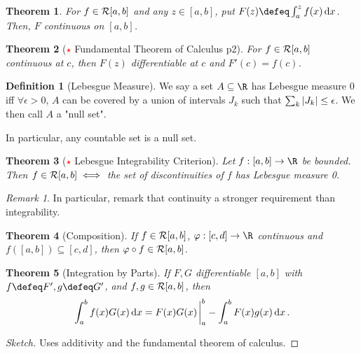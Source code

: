 \documentclass[12pt, oneside]{article}
\theoremstyle{definition}
\newtheorem{defn}{Definition}
\theoremstyle{plain}
\newtheorem{thm}{Theorem}
\theoremstyle{remark}
\newtheorem{remark}{Remark}
\begin{document}
\begin{thm}
  For $f \in \mathcal{R}[a, b]$ and any $z \in [a, b]$, put $F(z) \defeq \int_a^z f(x) \dd{x}$. Then, $F$ continuous on $[a, b]$.
\end{thm}

\begin{thm}[\textcolor{red}{$\star$} Fundamental Theorem of Calculus p2]
  For $f \in \mathcal{R}[a, b]$ continuous at $c$, then $F(z)$ differentiable at $c$ and $F'(c) = f(c)$.
\end{thm}


\begin{defn}[Lebesgue Measure]
  We say a set $A \subseteq \R$ has Lebesgue measure $0$ iff $\forall \epsilon > 0$, $A$ can be covered by a union of intervals $J_k$ such that $\sum_k \abs{J_k} \leq \epsilon$. We then call $A$ a "null set".

  In particular, any countable set is a null set.
\end{defn}

\begin{thm}[\textcolor{red}{$\star$} Lebesgue Integrability Criterion]
  Let $f : [a, b] \to \R$ be bounded. Then $f \in \mathcal{R}[a,b] \iff$ the set of discontinuities of $f$ has Lebesgue measure 0.
\end{thm}

\begin{remark}
  In particular, remark that continuity a stronger requirement than integrability.
\end{remark}

\begin{thm}[Composition]
  If $f \in \mathcal{R}[a, b]$, $\varphi : [c, d] \to \R$ continuous and $f([a, b]) \subseteq [c, d]$, then $\varphi \circ f \in \mathcal{R}[a, b]$.
\end{thm}

\begin{thm}[Integration by Parts]
  If $F, G$ differentiable $[a, b]$ with $f \defeq F', g \defeq G'$, and $f, g \in \mathcal{R}[a, b]$, then \[
  \int_a^b f(x) G(x) \dd{x} = F(x) G(x)\eval_{a}^b - \int_a^b F(x) g(x) \dd{x}.
  \]
\end{thm}

\begin{proof}[Sketch]
  Uses additivity and the fundamental theorem of calculus.
\end{proof}
\end{document}
